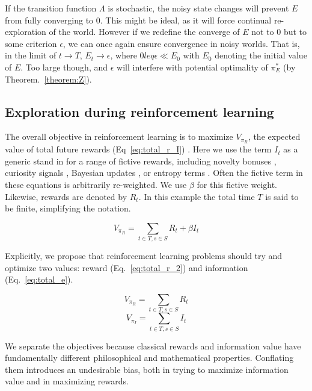 \documentclass[9pt,twocolumn,twoside]{pnas-new}
\begin{document}
If the transition function $\Lambda$ is stochastic, the noisy state changes will prevent $E$ from fully converging to 0. This might be ideal, as it will force continual re-exploration of the world. However if we redefine the converge of $E$ not to 0 but to some criterion $\epsilon$, we can once again ensure convergence in noisy worlds. That is, in the limit of $t \rightarrow T$, $E_t \rightarrow \epsilon$, where $0 leq \epsilon \ll E_0$ with $E_0$ denoting the initial value of $E$. Too large though, and $\epsilon$ will interfere with potential optimality of $\pi^*_E$ (by Theorem.~\ref{theorem:Z}). 


\subsection*{Exploration during reinforcement learning}
The overall objective in reinforcement learning is to maximize $V_{\pi_R}$, the expected value of total future rewards (Eq~\ref{eq:total_r_I}) \cite{Sutton2018}. Here we use the term $I_t$ as a generic stand in for a range of fictive rewards, including novelty bonuses \cite{Kakade2002}, curiosity signals \cite{Pathak2017}, Bayesian updates \cite{Radulescu2019}, or entropy terms \cite{Haarnoja2015,Haarnoja2017}.  Often the fictive term in these equations is arbitrarily re-weighted. We use $\beta$ for this fictive weight. Likewise, rewards are denoted by $R_t$. In this example the total time $T$ is said to be finite, simplifying the notation.

\begin{equation}
    V_{\pi_R} = \sum_{t \in T, s \in S} R_t + \beta I_t
    \label{eq:total_r_I}
\end{equation}

Explicitly, we propose that reinforcement learning problems should try and optimize two values: reward (Eq.~\ref{eq:total_r_2}) and information (Eq.~\ref{eq:total_e}). 

\begin{multicols}{2}
  \begin{equation}
    V_{\pi_R} = \sum_{t \in T, s \in S} R_t
    \label{eq:total_r_2}
  \end{equation} \break
  \begin{equation}
    V_{\pi_I} = \sum_{t \in T, s \in S} I_t
    \label{eq:total_e}
  \end{equation}
\end{multicols}

We separate the objectives because classical rewards and information value have fundamentally different philosophical and mathematical properties. Conflating them introduces an undesirable bias, both in trying to maximize information value and in maximizing rewards.
\end{document}
